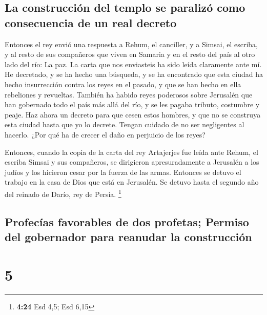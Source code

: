 \hypertarget{la-construcciuxf3n-del-templo-se-paralizuxf3-como-consecuencia-de-un-real-decreto}{%
\subsection{La construcción del templo se paralizó como consecuencia de
un real
decreto}\label{la-construcciuxf3n-del-templo-se-paralizuxf3-como-consecuencia-de-un-real-decreto}}

 Entonces el rey envió una respuesta a Rehum, el
canciller, y a Simsai, el escriba, y al resto de sus compañeros que
viven en Samaria y en el resto del país al otro lado del río: La paz.
 La carta que nos enviasteis ha sido leída claramente
ante mí.  He decretado, y se ha hecho una búsqueda, y se
ha encontrado que esta ciudad ha hecho insurrección contra los reyes en
el pasado, y que se han hecho en ella rebeliones y revueltas.
 También ha habido reyes poderosos sobre Jerusalén que
han gobernado todo el país más allá del río, y se les pagaba tributo,
costumbre y peaje.  Haz ahora un decreto para que cesen
estos hombres, y que no se construya esta ciudad hasta que yo lo
decrete.  Tengan cuidado de no ser negligentes al
hacerlo. ¿Por qué ha de crecer el daño en perjuicio de los reyes?

 Entonces, cuando la copia de la carta del rey Artajerjes
fue leída ante Rehum, el escriba Simsai y sus compañeros, se dirigieron
apresuradamente a Jerusalén a los judíos y los hicieron cesar por la
fuerza de las armas.  Entonces se detuvo el trabajo en la
casa de Dios que está en Jerusalén. Se detuvo hasta el segundo año del
reinado de Darío, rey de Persia. \footnote{\textbf{4:24} Esd 4,5; Esd
  6,15}

\hypertarget{profecuxedas-favorables-de-dos-profetas-permiso-del-gobernador-para-reanudar-la-construcciuxf3n}{%
\subsection{Profecías favorables de dos profetas; Permiso del gobernador
para reanudar la
construcción}\label{profecuxedas-favorables-de-dos-profetas-permiso-del-gobernador-para-reanudar-la-construcciuxf3n}}

\hypertarget{section-4}{%
\section{5}\label{section-4}}

